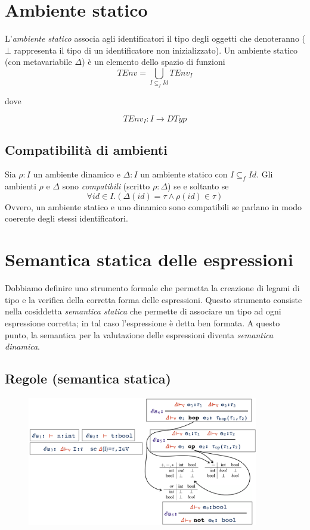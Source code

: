 \documentclass[a4paper,oneside,titlepage]{book}
\begin{document}
\section{Ambiente statico}
L'\textit{ambiente statico} associa agli identificatori il tipo degli oggetti che denoteranno ($\bot$ rappresenta il tipo di un identificatore non inizializzato). Un ambiente statico (con metavariabile $\Delta$) è un elemento dello spazio di funzioni	
\[ TEnv=\bigcup\limits_{I \subseteq_f Id} TEnv_I \]
\begin{center}
	dove
\end{center}
\[ TEnv_I: I \rightarrow DTyp \]

\subsection{Compatibilità di ambienti}
Sia $\rho:I$ un ambiente dinamico e $\Delta:I$ un ambiente statico con $I \subseteq_f Id$. Gli ambienti $\rho$ e $\Delta$ sono \textit{compatibili} (scritto $\rho:\Delta$) se e soltanto se 
\[ \forall id \in I. \left( \Delta(id)=\tau \wedge \rho(id) \in \tau \right) \]
Ovvero, un ambiente statico e uno dinamico sono compatibili se parlano in modo coerente degli stessi identificatori.

\section{Semantica statica delle espressioni}
Dobbiamo definire uno strumento formale che permetta la creazione di legami di tipo e la verifica della corretta forma delle espressioni. Questo strumento consiste nella cosiddetta \textit{semantica statica} che permette di associare un tipo ad ogni espressione corretta; in tal caso l'espressione è detta ben formata. A questo punto, la semantica per la valutazione delle espressioni diventa \textit{semantica dinamica}.

\subsection{Regole (semantica statica)}
\begin{figure}[htp]
	\centering
	\includegraphics[width=0.9\textwidth]{expRegole3.png}
\end{figure}
\end{document}
